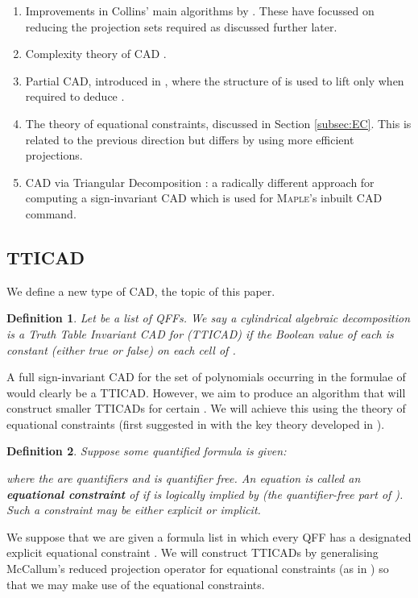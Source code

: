 \documentclass{article}
\newtheorem{definition}{Definition}
\begin{document}
\begin{enumerate}[itemsep=-5pt,topsep=-8pt]
\item Improvements in Collins' main algorithms by \cite[and many others]{McCallum1988}. These have focussed on reducing the projection sets required as 
discussed further later. 
\item Complexity theory of CAD \cite{BrownDavenport2007,DavenportHeintz1988}.
\item Partial CAD, introduced in \cite{CollinsHong1991}, where the structure of  is used to lift only when required to deduce .
\item The theory of equational constraints, 
\cite{McCallum1999a,McCallum2001,BrownMcCallum2005} discussed in Section \ref{subsec:EC}.  This is related to the previous direction but differs by using more efficient projections.  \item CAD via Triangular Decomposition \cite{Chenetal2009d}: a radically different approach for computing a sign-invariant CAD which is used for \textsc{Maple}'s inbuilt CAD command.
\end{enumerate}

\subsection{TTICAD}
\label{sec:Problem}

We define a new type of CAD, the topic of this paper.
\begin{definition}
Let  be a list of QFFs.
We say a cylindrical algebraic decomposition  is a {\em Truth Table Invariant} CAD for  (TTICAD) if the Boolean value of each  is constant (either true or false) on each cell of .
\end{definition}

A full sign-invariant CAD for the set of polynomials occurring in the formulae of  would clearly be a TTICAD.  However, we aim to produce an algorithm that will construct smaller TTICADs for certain . We will achieve this using the theory of equational constraints (first suggested in \cite{Collins1998} with the key theory developed in \cite{McCallum1999a}).
\begin{definition}
Suppose some quantified formula is given:

where the  are quantifiers and  is quantifier free.
An equation  is called an {\bf equational constraint} of  if  is logically implied by  (the quantifier-free part of ). 
Such a constraint may be either explicit or implicit.
\end{definition}
We suppose that we are given a formula list  in which every QFF  has a designated explicit equational constraint .
We will construct TTICADs by generalising McCallum's reduced projection operator for equational constraints (as in \cite{McCallum1999a}) so that we may make use of the equational constraints.
\end{document}
